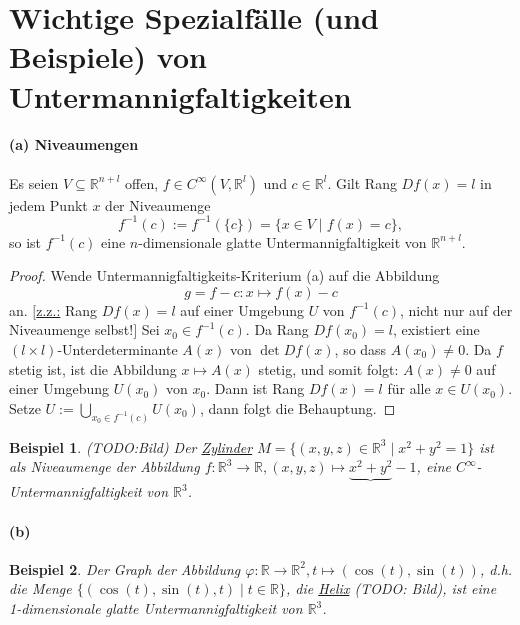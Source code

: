 \documentclass[a4paper,11pt,notitlepage]{report}
\newtheorem{example}{Beispiel}[chapter]
\newcommand{\R}{{\ensuremath{\mathbb{R}}}}
\begin{document}
\section{Wichtige Spezialfälle (und Beispiele) von Untermannigfaltigkeiten}
\paragraph{(a) Niveaumengen}
Es seien $V \subseteq \R^{n+l}$ offen, $f \in C^\infty(V,\R^l)$ und $c \in \R^l$. Gilt Rang $Df(x)=l$ in jedem Punkt $x$ der Niveaumenge
$$f^{-1}(c) := f^{-1}(\{c\}) = \{x \in V \mid f(x) = c\},$$
so ist $f^{-1}(c)$ eine $n$-dimensionale glatte Untermannigfaltigkeit von $\R^{n+l}$.

\begin{proof}
	Wende Untermannigfaltigkeits-Kriterium (a) auf die Abbildung $$g = f - c \colon x \mapsto f(x)-c$$ an.
	\newline
	$[$\underline{z.z.:} Rang $Df(x)=l$ auf einer Umgebung $U$ von $f^{-1}(c)$, nicht nur auf der Niveaumenge selbst!$]$
	\newline
	Sei $x_0 \in f^{-1}(c)$. Da Rang $Df(x_0) = l$, existiert eine $(l \times l)$-Unterdeterminante $A(x)$ von $\det{Df(x)}$, so dass $A(x_0)\neq 0$. Da $f$ stetig ist, ist die Abbildung $x \mapsto A(x)$ stetig, und somit folgt: $A(x)\neq 0$ auf einer Umgebung $U(x_0)$ von $x_0$. Dann ist Rang $Df(x)=l$ für alle $x \in U(x_0)$.
	\newline
	Setze $U:= \bigcup\limits_{x_0 \in f^{-1}(c)}{U(x_0)}$, dann folgt die Behauptung.
\end{proof}

\begin{example}
	(TODO:Bild)
	\newline
	Der \underline{Zylinder} $M=\{(x,y,z) \in \R^3 \mid x^2+y^2 = 1\}$ ist als Niveaumenge der Abbildung $f \colon \R^3 \rightarrow \R, (x,y,z) \mapsto \underbrace{x^2+y^2}-1$, eine $C^\infty$-Untermannigfaltigkeit von $\R^3$.
\end{example}

\paragraph{(b)}
\begin{example}
	Der Graph der Abbildung $\varphi \colon \R \rightarrow \R^2, t \mapsto (\cos{(t)},\sin{(t)})$, d.h. die Menge $\{(\cos{(t)},\sin{(t)},t) \mid t \in \R\}$, die \underline{Helix}
	(TODO: Bild), ist eine 1-dimensionale glatte Untermannigfaltigkeit von $\R^3$.
\end{example}
\end{document}
